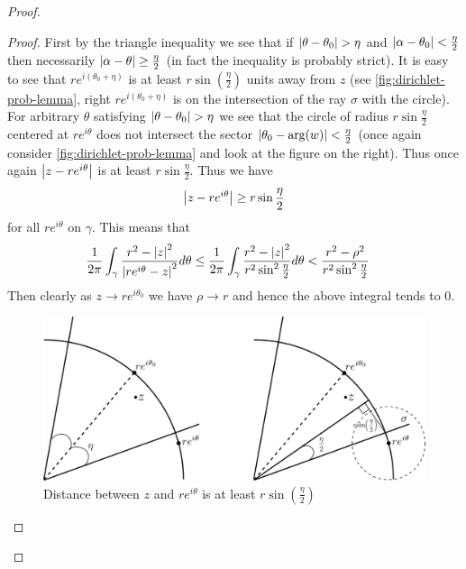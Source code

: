 \begin{proof}
\begin{proof}
    First by the triangle inequality we see that if $\left|\theta - \theta_0\right| > \eta$ and $\left|\alpha - \theta_0\right| < \frac{\eta}{2}$ then necessarily $\left|\alpha - \theta\right| \geq \frac{\eta}{2}$ (in fact the inequality is probably strict). It is easy to see that $re^{i(\theta_0 + \eta)}$ is at least $r \sin \left( \frac{\eta}{2} \right)$ units away from $z$ (see \autoref{fig:dirichlet-prob-lemma}, right $re^{i (\theta_0 + \eta)}$ is on the intersection of the ray $\sigma$ with the circle). For arbitrary $\theta$ satisfying $\left|\theta - \theta_0\right| > \eta$ we see that the circle of radius $r \sin\frac{\eta}{2}$ centered at $re^{i \theta}$ does not intersect the sector $\left|\theta_0 - \arg(w)\right| < \frac{\eta}{2}$ (once again consider \autoref{fig:dirichlet-prob-lemma} and look at the figure on the right). Thus once again $\left|z - re^{i \theta}\right|$ is at least $r \sin \frac{\eta}{2}$. Thus we have
    $$\left|z - re^{i \theta}\right| \geq r \sin \frac{\eta}{2}$$
    for all $re^{i \theta}$ on $\gamma$. This means that 
    \begin{align*}
        \frac{1}{2\pi} \int_{\gamma} \frac{r^2 - \left|z\right|^2}{\left|re^{i\theta} - z\right|^2} d\theta &\leq \frac{1}{2\pi} \int_\gamma \frac{r^2 - \left|z\right|^2}{r^2 \sin^2 \frac{\eta}{2}} d\theta < \frac{r^2 - \rho^2}{r^2 \sin^2 \frac{\eta}{2}}
    \end{align*}
    Then clearly as $z \to re^{i\theta_0}$ we have $\rho \to r$ and hence the above integral tends to 0.

    \begin{figure}[h]
        \centering
        \includegraphics[scale=0.8]{Images/dirichlet_prob_lemma.png}
        \caption{Distance between $z$ and $re^{i\theta}$ is at least $r \sin\left(\frac{\eta}{2}\right)$}
        \label{fig:dirichlet-prob-lemma}
    \end{figure}
\end{proof}


\end{proof}
